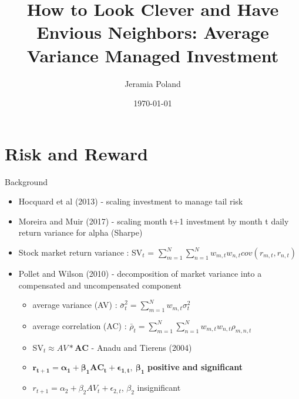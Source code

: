 \documentclass{beamer}
\begin{document}
\title[Average Variance]{How to Look Clever and Have Envious Neighbors: Average
	Variance Managed Investment}   
\author[J. Poland]{Jeramia Poland} 
\date{\today}

\begin{frame}
\titlepage
\end{frame}

\section{Risk and Reward}
\begin{frame}{Background}
	\begin{itemize}[<+->]
		\item Hocquard et al (2013) - scaling investment to manage tail risk
		\item Moreira and Muir (2017) - scaling month t+1 investment by month t daily return variance for alpha (Sharpe)
		\item Stock market return variance : SV$_{t}$ = $\sum_{m=1}^{N}\sum_{n=1}^{N}w_{m,t}w_{n,t}cov(r_{m,t},r_{n,t})$
		\item Pollet and Wilson (2010) - decomposition of market variance into a compensated and uncompensated component
		\begin{itemize}[<+->]
			\item average variance (AV) : $\bar{\sigma}^{2}_{t} = \sum_{m=1}^{N}w_{m,t}\sigma^{2}_{t}$
			\item average correlation (AC) : $\bar{\rho}_{t} = \sum_{m=1}^{N}\sum_{n=1}^{N}w_{m,t}w_{n,t}\rho_{m,n,t}$
			\item SV$_{t} \approx AV*\bm{AC}$  - Anadu and Tierens (2004)
			\item $\bm{r_{t+1} = \alpha_{1} + \beta_{1}AC_{t} + \epsilon_{1,t},~\beta_{1}}$ \textbf{positive and significant}
			\item $r_{t+1} = \alpha_{2} + \beta_{2}AV_{t} + \epsilon_{2,t}$, $\beta_{2}$ insignificant 

\end{itemize}
\end{itemize}
\end{frame}
\end{document}
